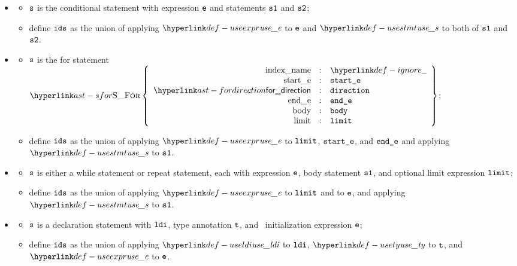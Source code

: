 \begin{itemize}
  \item {}
  \begin{itemize}
    \item $\texttt{s}$ is the conditional statement with expression $\texttt{e}$ and statements $\texttt{s1}$ and $\texttt{s2}$;
    \item define $\texttt{ids}$ as the union of applying $\useexpr$ to $\texttt{e}$ and $\usestmt$ to both of $\texttt{s1}$ and $\texttt{s2}$.
  \end{itemize}

  \item {}
  \begin{itemize}
    \item $\texttt{s}$ is the for statement $\SFor\left\{\begin{array}{rcl}
      \Forindexname &:& \Ignore\\
      \Forstarte &:& \vstarte\\
      \fordirection &:& \vdirection\\
      \Forende &:& \vende\\
      \Forbody &:& \vbody\\
      \Forlimit &:& \vlimit
    \end{array}\right\}$;
    \item define $\texttt{ids}$ as the union of applying $\useexpr$ to $\texttt{limit}$, $\texttt{start\_e}$, and $\texttt{end\_e}$ and applying $\usestmt$ to $\texttt{s1}$.
  \end{itemize}

  \item {}
  \begin{itemize}
    \item $\texttt{s}$ is either a while statement or repeat statement, each with expression $\texttt{e}$, body statement $\texttt{s1}$,
          and optional limit expression $\texttt{limit}$;
    \item define $\texttt{ids}$ as the union of applying $\useexpr$ to $\texttt{limit}$ and to $\texttt{e}$, and applying $\usestmt$ to $\texttt{s1}$.
  \end{itemize}

  \item {}
  \begin{itemize}
    \item $\texttt{s}$ is a declaration statement with \localdeclarationitem{} $\texttt{ldi}$,
      \optional{} type annotation $\texttt{t}$, and \optional\ initialization
      expression $\texttt{e}$;
    \item define $\texttt{ids}$ as the union of applying $\useldi$ to $\texttt{ldi}$, $\usety$ to $\texttt{t}$, and $\useexpr$ to $\texttt{e}$.
  \end{itemize}


\end{itemize}
